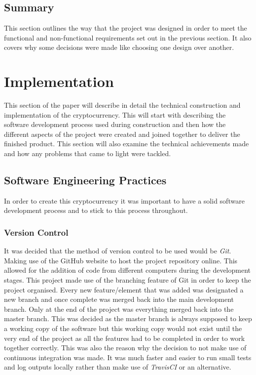 \documentclass{l4proj}
\begin{document}
\section{Summary}
This section outlines the way that the project was designed in order to meet the functional and non-functional 
requirements set out in the previous section. It also covers why some decisions were made like choosing one design 
over another.

\chapter{Implementation}
This section of the paper will describe in detail the technical construction and implementation of the cryptocurrency.
This will start with describing the software development process used during construction and then how the different
aspects of the project were created and joined together to deliver the finished product. This section will also examine the 
technical achievements made and how any problems that came to light were tackled.

\section{Software Engineering Practices}
In order to create this cryptocurrency it was important to have a solid software development process and to 
stick to this process throughout.

\subsection{Version Control}
It was decided that the method of version control to be used would be \textit{Git}. Making use of the GitHub \citep{github} website to 
host the project repository online. This allowed for the addition of code from different computers during the
development stages. This project made use of the branching feature of Git in order to keep the project organised.
Every new feature/element that was added was designated a new branch and once complete was merged back into the
main development branch. Only at the end of the project was everything merged back into the master branch. This
was decided as the master branch is always supposed to keep a working copy of the software but this working copy
would not exist until the very end of the project as all the features had to be completed in order to work together
correctly. This was also the reason why the decision to not make use of continuous integration was made. It was
much faster and easier to run small tests and log outputs locally rather than make use of \textit{TravisCI} \citep{travis} or an 
alternative.
\end{document}
